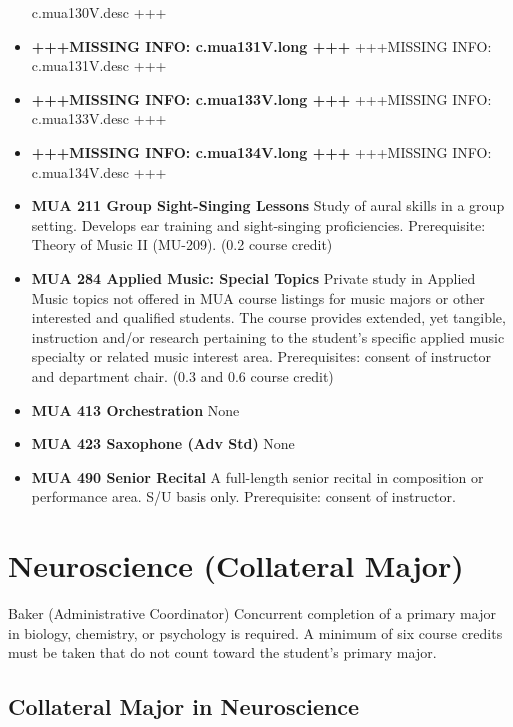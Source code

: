 \documentclass[
  letterpaper,
]{scrbook}
\begin{document}
\begin{itemize}
  c.mua130V.desc +++
\item
  \textbf{+++MISSING INFO: c.mua131V.long +++} +++MISSING INFO:
  c.mua131V.desc +++
\item
  \textbf{+++MISSING INFO: c.mua133V.long +++} +++MISSING INFO:
  c.mua133V.desc +++
\item
  \textbf{+++MISSING INFO: c.mua134V.long +++} +++MISSING INFO:
  c.mua134V.desc +++
\item
  \textbf{MUA 211 Group Sight-Singing Lessons} Study of aural skills in
  a group setting. Develops ear training and sight-singing
  proficiencies. Prerequisite: Theory of Music II (MU-209). (0.2 course
  credit)
\item
  \textbf{MUA 284 Applied Music: Special Topics} Private study in
  Applied Music topics not offered in MUA course listings for music
  majors or other interested and qualified students. The course provides
  extended, yet tangible, instruction and/or research pertaining to the
  student's specific applied music specialty or related music interest
  area. Prerequisites: consent of instructor and department chair. (0.3
  and 0.6 course credit)
\item
  \textbf{MUA 413 Orchestration} None
\item
  \textbf{MUA 423 Saxophone (Adv Std)} None
\item
  \textbf{MUA 490 Senior Recital} A full-length senior recital in
  composition or performance area. S/U basis only. Prerequisite: consent
  of instructor.
\end{itemize}

\section{Neuroscience (Collateral Major)}\label{sec-neuroscience}

Baker (Administrative Coordinator) Concurrent completion of a primary
major in biology, chemistry, or psychology is required. A minimum of six
course credits must be taken that do not count toward the student's
primary major.

\subsection{Collateral Major in
Neuroscience}\label{collateral-major-in-neuroscience}
\end{document}

